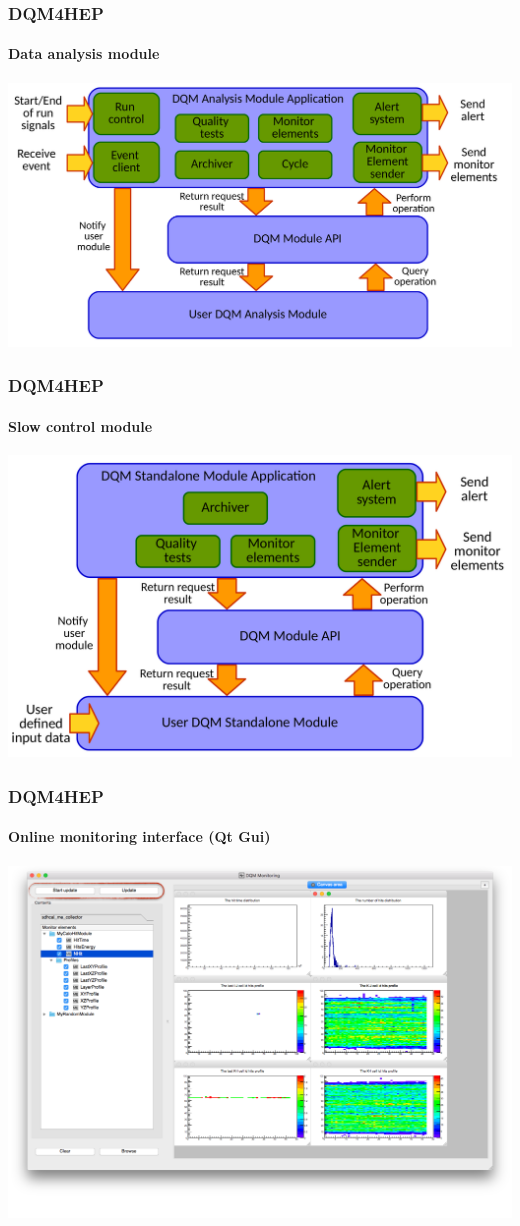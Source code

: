 \documentclass[presentation, 10pt]{beamer}
\begin{document}
\begin{frame}
  \frametitle{DQM4HEP}
  \framesubtitle{Data analysis module}
  \centering\includegraphics[width=0.9\linewidth]{figs/AnalysisModuleApplicationDiagram.pdf}
\end{frame}

\begin{frame}
  \frametitle{DQM4HEP}
  \framesubtitle{Slow control module}
  \centering\includegraphics[width=0.9\linewidth]{figs/StandaloneModuleApplicationDiagram.pdf}
\end{frame}

\begin{frame}
  \frametitle{DQM4HEP}
  \framesubtitle{Online monitoring interface (Qt Gui)}
    \centering\includegraphics[width=0.95\linewidth]{figs/DQM4HEPMonitoringGui.png}
\end{frame}
\end{document}
